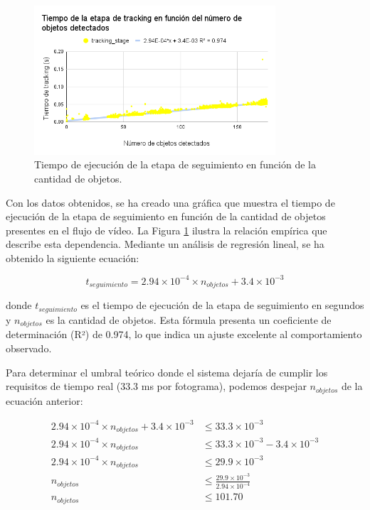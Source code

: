 \documentclass[11pt,spanish,listoffigures,listoftables]{tfgetsinf}
\begin{document}
\begin{figure}[H]
   \centering
   \includegraphics[width=0.8\textwidth]{images/analisis_de_la_solucion/cantidad_objetos/tiempo_etapa_tracking_cantidad_objetos.png}
   \caption[Tiempo de ejecución de la etapa de seguimiento en función de la cantidad de objetos]{Tiempo de ejecución de la etapa de seguimiento en función de la cantidad de objetos.}
   \label{fig:tiempo_etapa_tracking_cantidad_objetos}
\end{figure}

Con los datos obtenidos, se ha creado una gráfica que muestra el tiempo de ejecución de la etapa de seguimiento en función de la cantidad de objetos presentes en el flujo de vídeo. La Figura \ref{fig:tiempo_etapa_tracking_cantidad_objetos} ilustra la relación empírica que describe esta dependencia. Mediante un análisis de regresión lineal, se ha obtenido la siguiente ecuación:

\begin{equation}
t_{seguimiento} = 2.94 \times 10^{-4} \times n_{objetos} + 3.4 \times 10^{-3}
\end{equation}

donde $t_{seguimiento}$ es el tiempo de ejecución de la etapa de seguimiento en segundos y $n_{objetos}$ es la cantidad de objetos. Esta fórmula presenta un coeficiente de determinación (R²) de 0.974, lo que indica un ajuste excelente al comportamiento observado.

Para determinar el umbral teórico donde el sistema dejaría de cumplir los requisitos de tiempo real (33.3 ms por fotograma), podemos despejar $n_{objetos}$ de la ecuación anterior:

\begin{align}
   2.94 \times 10^{-4} \times n_{objetos} + 3.4 \times 10^{-3} &\leq 33.3 \times 10^{-3} \\
   2.94 \times 10^{-4} \times n_{objetos} &\leq 33.3 \times 10^{-3} - 3.4 \times 10^{-3} \\
   2.94 \times 10^{-4} \times n_{objetos} &\leq 29.9 \times 10^{-3} \\
   n_{objetos} &\leq \frac{29.9 \times 10^{-3}}{2.94 \times 10^{-4}} \\
   n_{objetos} &\leq 101.70
\end{align}
\end{document}
